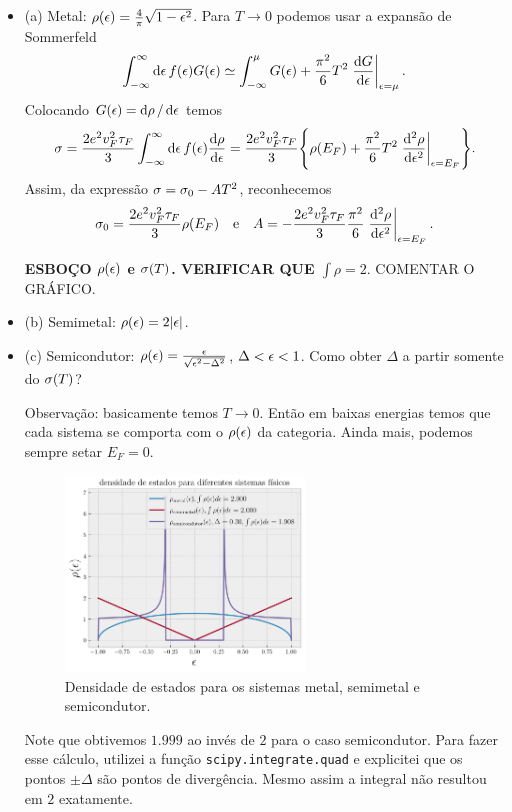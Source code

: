\documentclass[a4paper,10pt]{article}
\begin{document}
\begin{itemize}
\item (a) Metal: $\rho(\epsilon) = \frac{4}{\pi} \sqrt{1-\epsilon^2}$. Para $T \to 0$ podemos usar a expansão de Sommerfeld
$$
\int_{-\infty}^{\infty} \dd{\eps} f(\eps) G(\eps) \simeq
\int_{-\infty}^{\mu} G(\eps) + \frac{\pi^2}{6} T^2 \eval{\dv{G}{\eps}}_{\eps=\mu}.
$$
Colocando $G(\epsilon) = \dd{\rho}/\dd{\epsilon}$ temos
$$
\s = \frac{2e^2 v_F^2 \tau_F}{3}
\int_{-\infty}^{\infty} \dd{\eps} f(\eps) \dv{\rho}{\eps} =
\frac{2e^2 v_F^2 \tau_F}{3}
\qty{\rho(E_F) + \frac{\pi^2}{6} T^2 \eval{\dv[2]{\rho}{\eps}}_{\eps=E_F}}.
$$
Assim, da expressão $\sigma = \sigma_0 - A T^2$, reconhecemos
$$
\s_0 = \frac{2e^2 v_F^2 \tau_F}{3} \rho(E_F) \e
A = -\frac{2e^2v_F^2\tau_F}{3} \frac{\pi^2}{6} \eval{\dv[2]{\rho}{\eps}}_{\eps=E_F}.
$$

\textbf{ESBOÇO $\rho(\epsilon)$ e $\sigma(T)$. VERIFICAR QUE $\int\rho=2$}. COMENTAR O GRÁFICO.

\item (b) Semimetal: $\rho(\epsilon)=2\abs{\epsilon}$.

\item (c) Semicondutor: $\rho(\epsilon) = \frac{\epsilon}{\sqrt{\epsilon^2-\Delta^2}}$, $\Delta < \epsilon < 1$. Como obter $\Delta$ a partir somente do $\sigma(T)$?

Observação: basicamente temos $T \to 0$. Então em baixas energias temos que cada sistema se comporta com o $\rho(\epsilon)$ da categoria. Ainda mais, podemos sempre setar $E_F = 0$.

\begin{figure}[H]
\centering
\includegraphics[width=0.6\textwidth]{fig/dos-systems.png}
\caption{Densidade de estados para os sistemas metal, semimetal e semicondutor.}
\label{fig:dos-systems}
\end{figure}
Note que obtivemos $1.999$ ao invés de $2$ para o caso semicondutor. Para fazer esse cálculo, utilizei a função \texttt{scipy.integrate.quad} e explicitei que os pontos $\pm\Delta$ são pontos de divergência. Mesmo assim a integral não resultou em $2$ exatamente.


\end{itemize}
\end{document}
